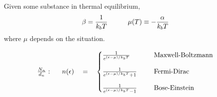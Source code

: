 \documentclass[12pt]{article}
\begin{document}
\newpage
Given some substance in thermal equilibrium,
\[\beta = \frac{1}{k_b T} \indent \indent \mu(T) \equiv - \frac{\alpha}{k_b T}\]
where \(\mu\) depends on the situation.

\[\begin{aligned}
    \tfrac{N_n}{d_n}: \indent n(\epsilon) \quad = \quad \begin{cases} 
        \frac{1}{ e^{ (\epsilon - \mu) / k_b T } }       & \indent \text{Maxwell-Boltzmann}\\[10pt]
        \frac{1}{ e^{ (\epsilon - \mu) / k_b T } + 1}    & \indent \text{Fermi-Dirac} \\[10pt]
        \frac{1}{ e^{ (\epsilon - \mu) / k_b T } - 1}    & \indent \text{Bose-Einstein}
    \end{cases}
\end{aligned}\]

\newpage
\end{document}
